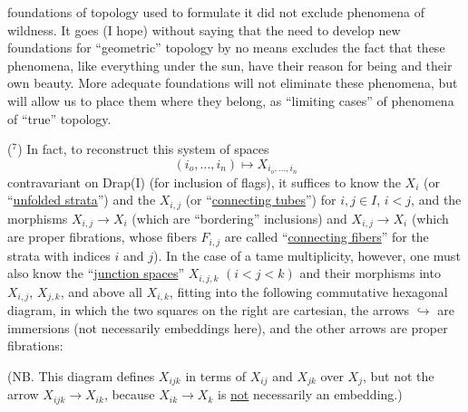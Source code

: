 
foundations of topology used to formulate it did not exclude
phenomena of wildness. It goes (I hope) without saying
that the need to develop new foundations for
``geometric'' topology by no means excludes the fact that these phenomena,
like everything under the sun, have their reason for being
and their own beauty. More adequate foundations will not eliminate
these phenomena, but will allow us to place them where they
belong, as ``limiting cases'' of phenomena of ``true''
topology.

($^7$) In fact, to reconstruct this system of spaces
\[ (i_o,\ldots,i_n) \longmapsto X_{i_o,\ldots,i_n} \]
contravariant on Drap(I) (for inclusion of flags), it
suffices to know the $X_i$ (or ``\uline{unfolded strata}'') and the $X_{i,j}$
(or ``\uline{connecting tubes}'') for $i,j \in I$, $i < j$, and the morphisms
$X_{i,j} \longrightarrow X_i$ (which are ``bordering'' inclusions) and $X_{i,j} \longrightarrow X_i$
(which are proper fibrations, whose fibers $F_{i,j}$ are
called ``\uline{connecting fibers}'' for the strata with indices $i$ and $j$).
In the case of a tame multiplicity, however, one must
also know the ``\uline{junction spaces}'' $X_{i,j,k}$ $(i < j < k)$ and their
morphisms into $X_{i,j}$, $X_{j,k}$, and above all $X_{i,k}$, fitting into
the following commutative hexagonal diagram, in which the two squares on
the right are cartesian, the arrows $\hookrightarrow$ are immersions (not
necessarily embeddings here), and the other arrows are
proper fibrations:


(NB. This diagram defines $X_{ijk}$ in terms of $X_{ij}$ and $X_{jk}$ over $X_j$,
but not the arrow $X_{ijk} \longrightarrow X_{ik}$, because $X_{ik} \longrightarrow X_k$ is \uline{not} necessarily
an embedding.)

